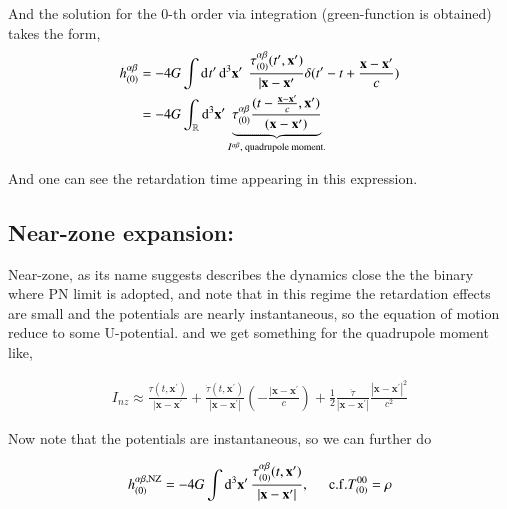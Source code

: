 \documentclass[a4paper, 12pt]{article}
\begin{document}
  And the solution for the 0-th order via integration (green-function
  is obtained) takes the form, 
  \begin{align}
    \label{0th order PN h}
    h_{(0)}^{\alpha \beta} &= - 4G \int \dd[]{t^{\prime}} 
    \dd[3]{\textbf{x}^{\prime}} \frac{}{} \frac{\tau_{(0)}^{\alpha
    \beta} ( t^{\prime}, \textbf{x}^{\prime} )}{ | \textbf{x} -
    \textbf{x}^{\prime} } \delta ( t^{\prime} - t  +
    \frac{\textbf{x} - \textbf{x}^{\prime}}{c} ) \\ 
    &= - 4G \int_{\mathbb{R}} \dd[3]{\textbf{x}^{\prime}} \underbrace{
    \tau_{(0)}^{\alpha \beta} \frac{( t - \frac{\textbf{x} -
    \textbf{x}^{\prime}}{c}, \textbf{x}^{\prime} )}{ ( \textbf{x}
    - \textbf{x}^{\prime}) } }_{I^{\alpha \beta},
    \textnormal{  quadrupole moment.}}
  \end{align}

And one can see the retardation time appearing in this expression. 


\subsection{Near-zone expansion: }%
  \label{sub:Near-zone expansion: }
  Near-zone, as its name suggests describes the dynamics close the the
  binary where PN limit is adopted, and note that in this regime the
  retardation effects are small and the potentials are nearly
  instantaneous, so the equation of motion reduce to some U-potential.
  and we get something for the quadrupole moment like, 

  \begin{align}
    \label{quadrupole moment}
    I_{nz} \approx \frac{\tau(t, \textbf{x}^{\prime})}{ |
    \textbf{x} - \textbf{x}^{\prime} } + \frac{\dot{\tau}(t,
    \textbf{x}^{\prime})}{| \textbf{x} - \textbf{x}^{\prime} |} ( -
    \frac{| \textbf{x} - \textbf{x}^{\prime}}{ c } ) +
    \frac{1}{2}
    \frac{\ddot{\tau}}{| \textbf{x} - \textbf{x}^{\prime} |} \frac{|
    \textbf{x} - \textbf{x}^{\prime} |^2}{c^2}
  \end{align}

  Now note that the potentials are instantaneous, so we can further do 

  \begin{align}
    \label{h form in near-zone}
    h_{(0)}^{\alpha \beta, \mathrm{NZ}} = -4G \int
    \dd[3]{\textbf{x}^{\prime}} \frac{\tau_{(0)}^{\alpha \beta} (t,
    \textbf{x}^{\prime})}{| \textbf{x} - \textbf{x}^{\prime} |},
    \hspace{0.5cm} \mathrm{c.f. } T_{(0)}^{00} = \rho 
  \end{align}
\end{document}
